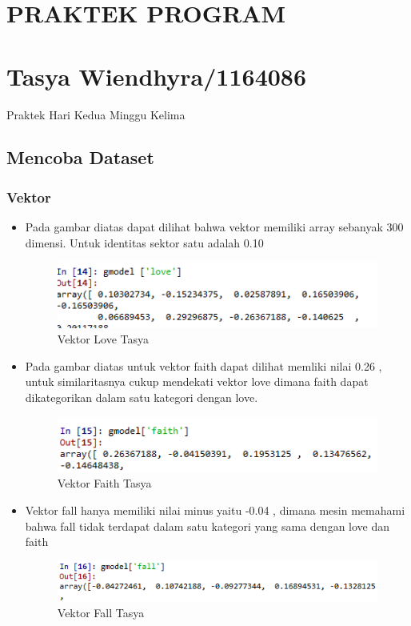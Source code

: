 \section{PRAKTEK PROGRAM}
\section{Tasya Wiendhyra/1164086}
Praktek Hari Kedua Minggu Kelima
\subsection{Mencoba Dataset}
\subsubsection{Vektor}
\begin{itemize}
\item Pada gambar diatas dapat dilihat bahwa vektor memiliki array sebanyak 300 dimensi. Untuk identitas sektor satu adalah 0.10
\begin{figure}[ht]
\centering
\includegraphics[scale=0.5]{figures/chapter5tasya4.png}
\caption{Vektor Love Tasya}
\label{Praktek}
\end{figure}


\item Pada gambar diatas untuk vektor faith dapat dilihat memliki nilai 0.26 , untuk similaritasnya cukup mendekati vektor love dimana faith dapat dikategorikan dalam satu kategori dengan love.
\begin{figure}[ht]
\centering
\includegraphics[scale=0.5]{figures/chapter5tasya5.png}
\caption{Vektor Faith Tasya}
\label{Praktek}
\end{figure}


\item Vektor fall hanya memiliki nilai minus yaitu -0.04 , dimana mesin memahami bahwa fall tidak terdapat dalam satu kategori yang sama dengan love dan faith
\begin{figure}[ht]
\centering
\includegraphics[scale=0.5]{figures/chapter5tasya6.png}
\caption{Vektor Fall Tasya}
\label{Praktek}
\end{figure}



\end{itemize}
